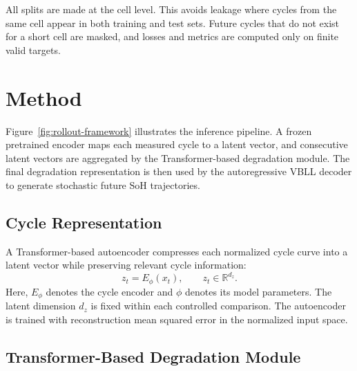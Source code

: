 \documentclass[conference]{IEEEtran}
\begin{document}
All splits are made at the cell level. This avoids leakage where cycles from
the same cell appear in both training and test sets. Future cycles that do not
exist for a short cell are masked, and losses and metrics are computed only on
finite valid targets.

\section{Method}

Figure~\ref{fig:rollout-framework} illustrates the inference pipeline. A
frozen pretrained encoder maps each measured cycle to a latent vector, and
consecutive latent vectors are aggregated by the Transformer-based degradation
module. The final degradation representation is then used by the
autoregressive VBLL decoder to generate stochastic future SoH trajectories.

\subsection{Cycle Representation}

A Transformer-based autoencoder compresses each normalized cycle curve into
a latent vector while preserving relevant cycle information:
\begin{equation}
z_t = E_{\phi}(x_t), \qquad z_t \in \mathbb{R}^{d_z}.
\end{equation}
Here, $E_{\phi}$ denotes the cycle encoder and $\phi$ denotes its model
parameters.
The latent dimension $d_z$ is fixed within each controlled comparison. The
autoencoder is trained with reconstruction mean squared error in the normalized
input space.

\subsection{Transformer-Based Degradation Module}
\end{document}
